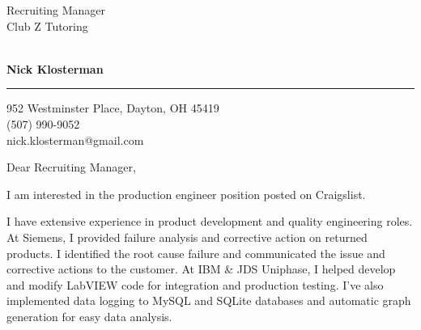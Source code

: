 \documentclass{letter} %
\makeatletter
\newcommand{\contactperson}{Recruiting Manager}
\newcommand{\contactCompany}{Club Z Tutoring}
\newcommand{\contactStreetAddress}{ }  %
\newcommand{\contactCityStateZip}{ }
\newcommand{\position}{production engineer }%
\newcommand{\jobpostingsource}{Craigslist} %
\newcommand{\personalphonenumber}{(507) 990-9052}
\newcommand{\personalemail}{nick.klosterman@gmail.com}
\makeatother
\begin{document}
\signature{Nick Klosterman}           %
\longindentation=0pt                       %
\let\raggedleft\raggedright                %
 

 
\begin{letter}{\contactperson \\
\contactCompany \\
\contactStreetAddress \\
\contactCityStateZip

}

  \begin{flushright}
 \hfill   \large\bf Nick Klosterman  \\
\end{flushright}
\begin{flushright}
    \medskip\hrule height 1pt
    \hfill 952 Westminster Place, Dayton, OH 45419 \\
    \hfill \personalphonenumber \\
    \hfill \personalemail
  \end{flushright} 
\vfill %

 
\opening{Dear \contactperson ,} 

\noindent 
I am interested in the \position position posted on \jobpostingsource. 

\noindent
I have extensive experience in product development and quality engineering roles. 
At Siemens, I provided failure analysis and corrective action on returned products. 
I identified the root cause failure and communicated the issue and corrective actions to the customer.
At IBM \& JDS Uniphase, I helped develop and modify LabVIEW code for integration and production testing.
I've also implemented data logging to MySQL and SQLite databases and automatic graph generation for easy data analysis.


\end{letter}
\end{document}
